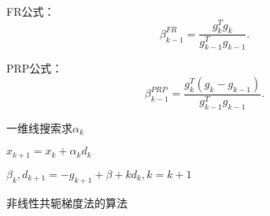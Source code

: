 FR公式\cite{1964Fletcher}：
\begin{equation}
    \beta_{k-1}^{FR}=\displaystyle\frac{g_k^Tg_k}{g_{k-1}^Tg_{k-1}} .
    \nonumber
\end{equation}
        
PRP公式\cite{Book1}：
\begin{equation}
    \beta_{k-1}^{PRP}=\displaystyle\frac{g_k^T(g_k-g_{k-1})}{g_{k-1}^Tg_{k-1}} .
    \nonumber
\end{equation}

\begin{algorithm}

    \SetAlgoLined

     {
        一维线搜索求$\alpha_k$
        
        $x_{k+1}=x_k+\alpha_kd_k$

        $\beta_k,d_{k+1}=-g_{k+1}+\beta+kd_k,k=k+1$
    }
    \caption{非线性共轭梯度法的算法}
\end{algorithm}

